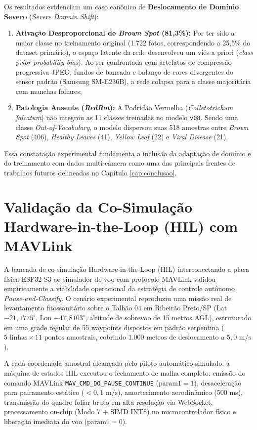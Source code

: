 Os resultados evidenciam um caso canônico de \textbf{Deslocamento de Domínio Severo} (\textit{Severe Domain Shift}):
\begin{enumerate}
    \item \textbf{Ativação Desproporcional de \textit{Brown Spot} (81,3\%):} Por ter sido a maior classe no treinamento original (1.722 fotos, correspondendo a 25,5\% do dataset primário), o espaço latente da rede desenvolveu um viés a priori (\textit{class prior probability bias}). Ao ser confrontada com artefatos de compressão progressiva JPEG, fundos de bancada e balanço de cores divergentes do sensor padrão (Samsung SM-E236B), a rede colapsa para a classe majoritária com manchas foliares;
    \item \textbf{Patologia Ausente (\textit{RedRot}):} A Podridão Vermelha (\textit{Colletotrichum falcatum}) não integrou as 11 classes treinadas no modelo \texttt{v08}. Sendo uma classe \textit{Out-of-Vocabulary}, o modelo dispersou suas 518 amostras entre \textit{Brown Spot} (406), \textit{Healthy Leaves} (41), \textit{Yellow Leaf} (22) e \textit{Viral Disease} (21).
\end{enumerate}

Essa constatação experimental fundamenta a inclusão da adaptação de domínio e do treinamento com dados multi-câmera como uma das principais frentes de trabalhos futuros delineadas no Capítulo \ref{cap:conclusao}.

\section{Validação da Co-Simulação Hardware-in-the-Loop (HIL) com MAVLink}

A bancada de co-simulação Hardware-in-the-Loop (HIL) interconectando a placa física ESP32-S3 ao simulador de voo com protocolo MAVLink validou empiricamente a viabilidade operacional da estratégia de controle autônomo \textit{Pause-and-Classify}. O cenário experimental reproduziu uma missão real de levantamento fitossanitário sobre o Talhão 04 em Ribeirão Preto/SP (Lat $-21,1775^\circ$, Lon $-47,8103^\circ$, altitude de sobrevoo de 15 metros AGL), estruturado em uma grade regular de 55 waypoints dispostos em padrão serpentina ($5\text{ linhas} \times 11\text{ pontos}$ amostrais, cobrindo $1.000\text{ metros}$ de deslocamento a $5,0\text{ m/s}$).

A cada coordenada amostral alcançada pelo piloto automático simulado, a máquina de estados HIL executou o fechamento de malha completo: emissão do comando MAVLink \texttt{MAV\_CMD\_DO\_PAUSE\_CONTINUE} ($\text{param1}=1$), desaceleração para pairamento estático ($<0,1\text{ m/s}$), amortecimento aerodinâmico (500 ms), transmissão do quadro foliar bruto em alta resolução via WebSocket, processamento on-chip (Modo 7 + SIMD INT8) no microcontrolador físico e liberação imediata do voo ($\text{param1}=0$).

